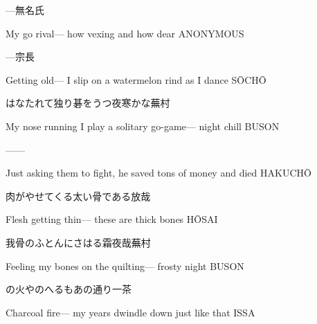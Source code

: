 \begin{haiku}
    {---}\hfill{\FH 無名氏}

    \vin{} My go rival---
    \vin{} \vin{} how vexing
    \vin{} \vin{} \vin{} and how dear \hspace{\fill} ANONYMOUS
\end{haiku}

\begin{haiku}
    {---}\hfill{\FH 宗長}

    \vin{} Getting old---
    \vin{} \vin{} I slip on a watermelon rind
    \vin{} \vin{} \vin{} as I dance \hspace{\fill} S\={O}CH\={O}
\end{haiku}

\begin{haiku}
    {\FH はなたれて独り碁をうつ夜寒かな}\hfill{\FH 蕪村}

    \vin{} My nose running
    \vin{} \vin{} I play a solitary go-game---
    \vin{} \vin{} \vin{} night chill \hspace{\fill} BUSON
\end{haiku}

\begin{haiku}
   ---\hfill{---}

    \vin{} Just asking them to fight,
    \vin{} \vin{} he saved tons of money
    \vin{} \vin{} \vin{} and died \hspace{\fill} HAKUCH\={O}
\end{haiku}

\begin{haiku}
    {\FH 肉がやせてくる太い骨である}\hfill{\FH 放哉}

    \vin{} Flesh getting thin---
    \vin{} \vin{} these are thick bones \hspace{\fill} H\={O}SAI
\end{haiku}

\begin{haiku}
    {\FH 我骨のふとんにさはる霜夜哉}\hfill{\FH 蕪村}

    \vin{} Feeling my bones
    \vin{} \vin{} on the quilting---
    \vin{} \vin{} \vin{} frosty night \hspace{\fill} BUSON
\end{haiku}

\begin{haiku}
    {\FH {}の火やのへるもあの通り}\hfill{\FH 一茶}

    \vin{} Charcoal fire---
    \vin{} \vin{} my years dwindle down
    \vin{} \vin{} \vin{} just like that \hspace{\fill} ISSA
\end{haiku}

